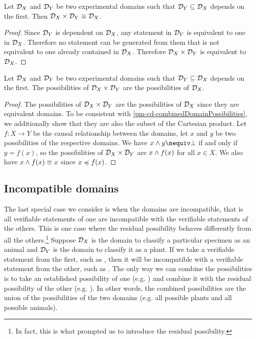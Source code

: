 \begin{mathSection}
	\begin{prop}
		Let $\mathcal{D}_X$ and $\mathcal{D}_Y$ be two experimental domains such that $\mathcal{D}_Y \subseteq \mathcal{D}_X$ depends on the first. Then $\mathcal{D}_X \times \mathcal{D}_Y \equiv \mathcal{D}_X$.
	\end{prop}
	\begin{proof}
		Since $\mathcal{D}_Y$ is dependent on $\mathcal{D}_X$, any statement in $\mathcal{D}_Y$ is equivalent to one in $\mathcal{D}_X$. Therefore no statement can be generated from them that is not equivalent to one already contained in $\mathcal{D}_X$. Therefore $\mathcal{D}_X \times \mathcal{D}_Y$ is equivalent to $\mathcal{D}_X$. 
	\end{proof}
	\begin{coro}
		Let $\mathcal{D}_X$ and $\mathcal{D}_Y$ be two experimental domains such that $\mathcal{D}_Y \subseteq \mathcal{D}_X$ depends on the first. The possibilities of $\mathcal{D}_X \times \mathcal{D}_Y$ are the possibilities of $\mathcal{D}_X$.
	\end{coro}
	\begin{proof}
		The possibilities of $\mathcal{D}_X \times \mathcal{D}_Y$ are the possibilities of $\mathcal{D}_X$ since they are equivalent domains. To be consistent with \ref{pm-cd-combinedDomainPossibilities}, we additionally show that they are also the subset of the Cartesian product. Let $f : X \to Y$ be the causal relationship between the domains, let $x$ and $y$ be two possibilities of the respective domains. We have $x \AND y \nequiv \impossibility$ if and only if $y = f(x)$, so the possibilities of $\mathcal{D}_X \times \mathcal{D}_Y$ are $x \wedge f(x)$ for all $x \in X$. We also have $x \wedge f(x) \equiv x$ since $x \preccurlyeq f(x)$.
	\end{proof}
\end{mathSection}


\subsection{Incompatible domains}

The last special case we consider is when the domains are incompatible, that is all verifiable statements of one are incompatible with the verifiable statements of the others. This is one case where the residual possibility behaves differently from all the others.\footnote{In fact, this is what prompted us to introduce the residual possibility.} Suppose $\mathcal{D}_X$ is the domain to classify a particular specimen as an animal and $\mathcal{D}_Y$ is the domain to classify it as a plant. If we take a verifiable statement from the first, such as , then it will be incompatible with a verifiable statement from the other, such as . The only way we can combine the possibilities is to take an established possibility of one (e.g. ) and combine it with the residual possibility of the other (e.g. ). In other words, the combined possibilities are the union of the possibilities of the two domains (e.g. all possible plants and all possible animals).

